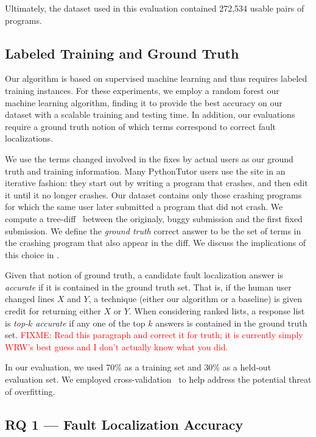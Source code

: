\documentclass[conference]{IEEEtran}
\newcommand{\fixme}[1]{\textcolor{red}{FIXME: #1}}
\begin{document}
Ultimately, the dataset used in this evaluation contained
272,534 usable pairs of programs.

\subsection{Labeled Training and Ground Truth}
\label{sec-training}

Our algorithm is based on supervised machine learning and thus requires
labeled training instances.  For these experiments, we employ a random
forest our machine learning algorithm, finding it to provide the best
accuracy on our dataset with a scalable training and testing time.  In
addition, our evaluations require a ground truth notion of which terms
correspond to correct fault localizations.

We use the terms changed involved in the fixes by actual users as our
ground truth and training information.  Many PythonTutor users use the site
in an iterative fashion: they start out by writing a program that crashes,
and then edit it until it no longer crashes. Our dataset contains only
those crashing programs for which the same user later submitted a program
that did not crash. We compute a tree-diff~\cite{tree-diff} between the
originaly, buggy submission and the first fixed submission. We define
the \emph{ground truth} correct answer to be the set of terms in the
crashing program that also appear in the diff. We discuss the implications
of this choice in .

Given that notion of ground truth, a candidate fault localization answer is
\emph{accurate} if it is contained in the ground truth set. That is, if the
human user changed lines $X$ and $Y$, a technique (either our algorithm
or a baseline) is given credit for returning either $X$ or $Y$. When
considering ranked lists, a response list is \emph{top-$k$ accurate} if any one
of the top $k$ answers is contained in the ground truth set. \fixme{Read
this paragraph and correct it for truth; it is currently simply WRW's best
guess and I don't actually know what you did.}

In our evaluation, we used 70\% as a training set and 30\% as a held-out
evaluation set. We employed cross-validation~\cite{kohavi} to help address
the potential threat of overfitting.

\subsection{RQ 1 --- Fault Localization Accuracy}
\end{document}
